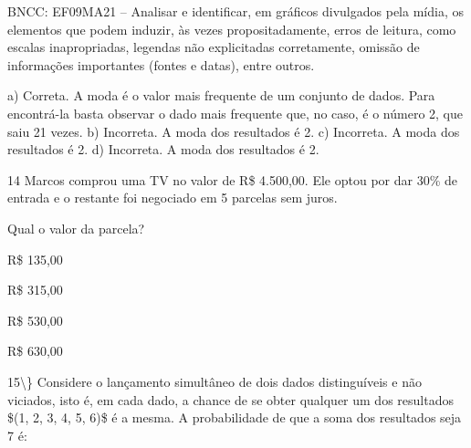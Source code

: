 {{{\begin{escolha}
{{{{\begin{escolha}
\begin{escolha}
{\begin{escolha}
\begin{escolha}
\begin{escolha}
\begin{escolha}
\begin{escolha}
\begin{escolha}
{BNCC: EF09MA21 -- Analisar e identificar, em gráficos divulgados pela
mídia, os elementos que podem induzir, às vezes propositadamente, erros
de leitura, como escalas inapropriadas, legendas não explicitadas
corretamente, omissão de informações importantes (fontes e datas), entre
outros.

a) Correta. A moda é o valor mais frequente de um conjunto de dados. Para
encontrá-la basta observar o dado mais frequente que, no caso, é o número
2, que saiu 21 vezes.
b) Incorreta. A moda dos resultados é 2.
c) Incorreta. A moda dos resultados é 2.
d) Incorreta. A moda dos resultados é 2.}

\num{14} Marcos comprou uma TV no valor de R\$ 4.500,00. Ele optou por dar
30\% de entrada e o restante foi negociado em 5 parcelas sem juros.

Qual o valor da parcela?

\begin{escolha}
  \item R\$ 135,00

  \item R\$ 315,00

  \item R\$ 530,00

  \item R\$ 630,00
\end{escolha}


\num{15\} Considere o lançamento simultâneo de dois dados
distinguíveis e não viciados, isto é, em cada dado, a chance de se obter
qualquer um dos resultados $(1, 2, 3, 4, 5, 6)$ é a mesma. A probabilidade
de que a soma dos resultados seja 7 é:

}
\end{escolha}
\end{escolha}
\end{escolha}
\end{escolha}
\end{escolha}
\end{escolha}}
\end{escolha}
\end{escolha}}}}}
\end{escolha}}}}
